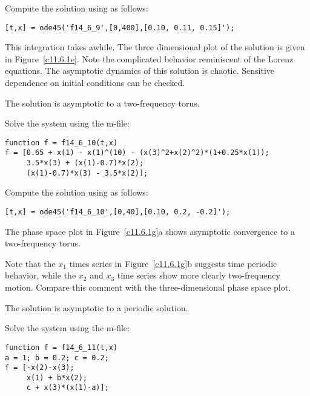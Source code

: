 Compute the solution using \Matlab as follows:
\begin{verbatim}
[t,x] = ode45('f14_6_9',[0,400],[0.10, 0.11, 0.15]');
\end{verbatim}
This integration takes awhile.  The three dimensional plot of the
solution is given in Figure~\ref{c11.6.1e}.  Note the complicated behavior
reminiscent of the Lorenz equations.  The asymptotic dynamics of this
solution is chaotic.  Sensitive dependence on initial conditions can be
checked.

\begin{figure}[htb]
     \centerline{%
     }
\end{figure} 

 \ans The solution is asymptotic to a two-frequency torus.

\soln Solve the system using the m-file:
\begin{verbatim}
function f = f14_6_10(t,x)
f = [0.65 + x(1) - x(1)^(10) - (x(3)^2+x(2)^2)*(1+0.25*x(1)); 
     3.5*x(3) + (x(1)-0.7)*x(2); 
     (x(1)-0.7)*x(3) - 3.5*x(2)];
\end{verbatim}

Compute the solution using \Matlab as follows:
\begin{verbatim}
[t,x] = ode45('f14_6_10',[0,40],[0.10, 0.2, -0.2]');
\end{verbatim}
The phase space plot in Figure~\ref{c11.6.1g}a shows asymptotic convergence to
a two-frequency torus.

Note that the $x_1$ times series in Figure~\ref{c11.6.1g}b 
suggests time periodic behavior, while the $x_2$ and $x_3$ time series 
show more clearly two-frequency motion.  Compare this comment with the
three-dimensional phase space plot.

\begin{figure}[htb]
     \centerline{%
     }
\end{figure} 


 \ans The solution is asymptotic to a periodic solution.

\soln Solve the system using the m-file:
\begin{verbatim}
function f = f14_6_11(t,x)
a = 1; b = 0.2; c = 0.2;
f = [-x(2)-x(3); 
     x(1) + b*x(2); 
     c + x(3)*(x(1)-a)];
\end{verbatim}

